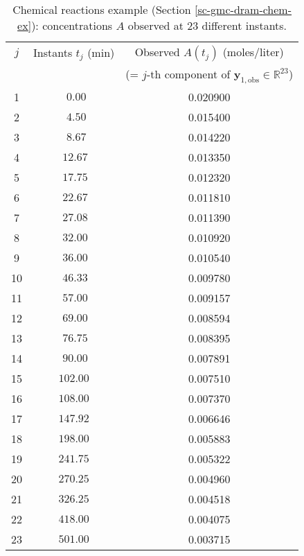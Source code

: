 \begin{table}[h!]
\begin{center}
\begin{tabular}{|c|c|c|}
\hline
$j$ & Instants $t_j$ (min) & Observed $A(t_j)$ (moles/liter)                                       \\
    &                      & (= $j$-th component of $\mathbf{y}_{1,\text{obs}}\in\mathbb{R}^{23}$) \\
\hline
\hline
 1  & $~~0.00$             & 0.020900  \\
\hline
 2  & $~~4.50$             & 0.015400  \\
\hline
 3  & $~~8.67$             & 0.014220  \\
\hline
 4  & $~12.67$             & 0.013350  \\
\hline
 5  & $~17.75$             & 0.012320  \\
\hline
 6  & $~22.67$             & 0.011810  \\
\hline
 7  & $~27.08$             & 0.011390  \\
\hline
 8  & $~32.00$             & 0.010920  \\
\hline
 9  & $~36.00$             & 0.010540  \\
\hline
10  & $~46.33$             & 0.009780  \\
\hline
11  & $~57.00$             & 0.009157 \\
\hline
12  & $~69.00$             & 0.008594 \\
\hline
13  & $~76.75$             & 0.008395 \\
\hline
14  & $~90.00$             & 0.007891 \\
\hline
15  & $102.00$             & 0.007510 \\
\hline
16  & $108.00$             & 0.007370 \\
\hline
17  & $147.92$             & 0.006646 \\
\hline
18  & $198.00$             & 0.005883 \\
\hline
19  & $241.75$             & 0.005322 \\
\hline
20  & $270.25$             & 0.004960 \\
\hline
21  & $326.25$             & 0.004518 \\
\hline
22  & $418.00$             & 0.004075 \\
\hline
23  & $501.00$             & 0.003715 \\
\hline
\end{tabular}
\caption{Chemical reactions example (Section \ref{sc-gmc-dram-chem-ex}):
concentrations $A$ observed at 23 different instants.
}
\label{tab-dram-chem-ex-sys-y1-obs}
\end{center}
\end{table}

